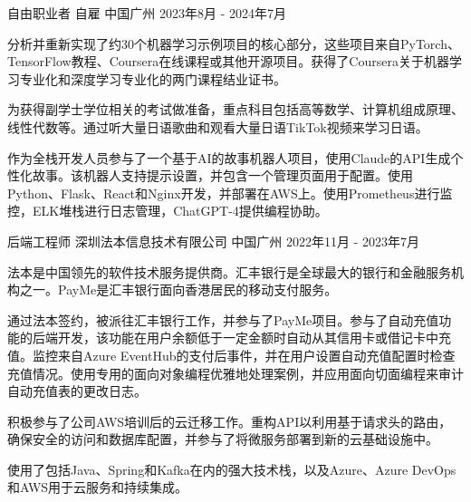 \begin{cventries}
  \cventry
    {自由职业者} %
    {自雇} %
    {中国广州} %
    {2023年8月 - 2024年7月} %
    {
      \begin{cvitems} %
        \item {分析并重新实现了约30个机器学习示例项目的核心部分，这些项目来自PyTorch、TensorFlow教程、Coursera在线课程或其他开源项目。获得了Coursera关于机器学习专业化和深度学习专业化的两门课程结业证书。}
        \item {为获得副学士学位相关的考试做准备，重点科目包括高等数学、计算机组成原理、线性代数等。通过听大量日语歌曲和观看大量日语TikTok视频来学习日语。}
        \item {作为全栈开发人员参与了一个基于AI的故事机器人项目，使用Claude的API生成个性化故事。该机器人支持提示设置，并包含一个管理页面用于配置。使用Python、Flask、React和Nginx开发，并部署在AWS上。使用Prometheus进行监控，ELK堆栈进行日志管理，ChatGPT-4提供编程协助。}
      \end{cvitems}
    }

  \cventry
    {后端工程师} %
    {深圳法本信息技术有限公司} %
    {中国广州} %
    {2022年11月 - 2023年7月} %
    {
      \begin{cvitems} %
        \item {法本是中国领先的软件技术服务提供商。汇丰银行是全球最大的银行和金融服务机构之一。PayMe是汇丰银行面向香港居民的移动支付服务。}
        \item {通过法本签约，被派往汇丰银行工作，并参与了PayMe项目。参与了自动充值功能的后端开发，该功能在用户余额低于一定金额时自动从其信用卡或借记卡中充值。监控来自Azure EventHub的支付后事件，并在用户设置自动充值配置时检查充值情况。使用专用的面向对象编程优雅地处理案例，并应用面向切面编程来审计自动充值表的更改日志。}
        \item {积极参与了公司AWS培训后的云迁移工作。重构API以利用基于请求头的路由，确保安全的访问和数据库配置，并参与了将微服务部署到新的云基础设施中。}
        \item {使用了包括Java、Spring和Kafka在内的强大技术栈，以及Azure、Azure DevOps和AWS用于云服务和持续集成。}
      \end{cvitems}
    }


\end{cventries}
